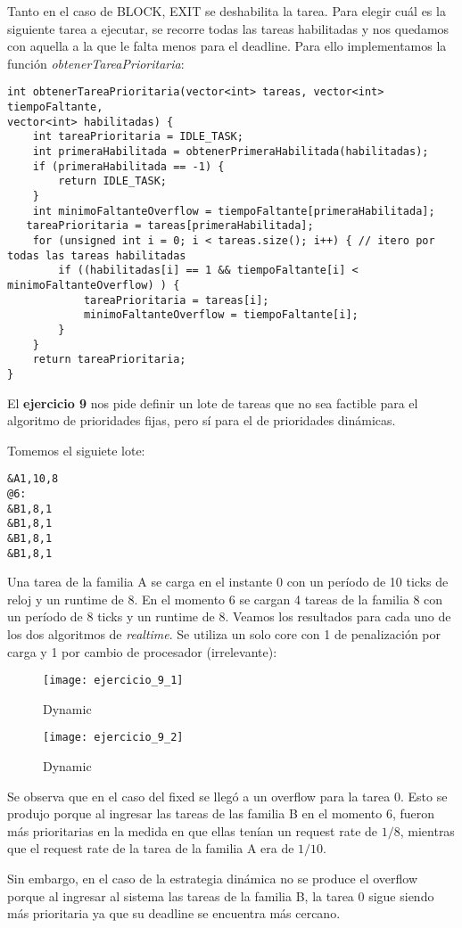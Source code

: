 Tanto en el caso de BLOCK, EXIT se deshabilita la tarea. Para elegir cu\'al es la siguiente tarea a ejecutar, se recorre todas las tareas habilitadas y nos quedamos con aquella a la que le falta menos para el deadline. Para ello implementamos  la funci\'on \textit{obtenerTareaPrioritaria}:

\begin{verbatim}
int obtenerTareaPrioritaria(vector<int> tareas, vector<int> tiempoFaltante,
vector<int> habilitadas) {
    int tareaPrioritaria = IDLE_TASK;
    int primeraHabilitada = obtenerPrimeraHabilitada(habilitadas);
    if (primeraHabilitada == -1) {
        return IDLE_TASK;
    }
    int minimoFaltanteOverflow = tiempoFaltante[primeraHabilitada];
   tareaPrioritaria = tareas[primeraHabilitada];
    for (unsigned int i = 0; i < tareas.size(); i++) { // itero por todas las tareas habilitadas
        if ((habilitadas[i] == 1 && tiempoFaltante[i] < minimoFaltanteOverflow) ) {
            tareaPrioritaria = tareas[i];
            minimoFaltanteOverflow = tiempoFaltante[i];
        }
    }
    return tareaPrioritaria;	
} 

\end{verbatim}

El \textbf{ejercicio 9} nos pide definir un lote de tareas que no sea factible para el algoritmo de prioridades fijas, pero s\'i para el de prioridades din\'amicas. 

Tomemos el siguiete lote:

\begin{verbatim}
&A1,10,8
@6:
&B1,8,1
&B1,8,1
&B1,8,1
&B1,8,1
\end{verbatim}

Una tarea de la familia A se carga en el instante 0 con un per\'iodo de 10 ticks de reloj y un runtime de 8. En el momento 6 se cargan 4 tareas de la familia 8 con un per\'iodo de 8 ticks y un runtime de 8. Veamos los resultados para cada uno de los dos algoritmos de \textit{realtime}. Se utiliza un solo core con 1 de penalizaci\'on por carga y 1 por cambio de procesador (irrelevante):

\begin{figure}[H]
\caption{Dynamic}
\texttt{[image: ejercicio\_9\_1]}
\end{figure}

\begin{figure}[H]
\caption{Dynamic}
\texttt{[image: ejercicio\_9\_2]}
\end{figure}

Se observa que en el caso del fixed se lleg\'o a un overflow para la tarea 0. Esto se produjo porque al ingresar las tareas de las familia B en el momento 6, fueron m\'as prioritarias en la medida en que ellas ten\'ian un request rate de $1/8$, mientras que el request rate de la tarea de la familia A era de $1/10$. 

Sin embargo, en el caso de la estrategia din\'amica no se produce el overflow porque al ingresar al sistema las tareas de la familia B, la tarea 0 sigue siendo m\'as prioritaria ya que su deadline se encuentra m\'as cercano.